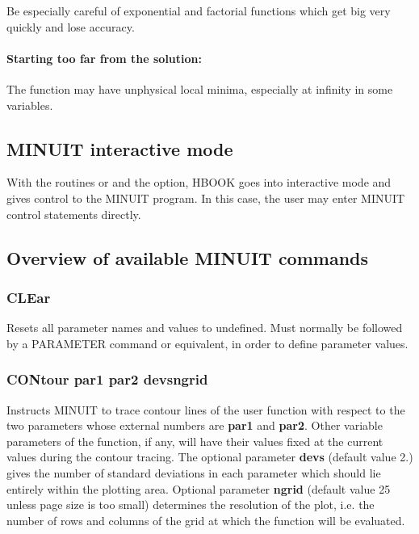 Be especially careful of exponential and factorial functions
which get big very quickly and lose accuracy.

\paragraph{Starting too far from the solution:}

The function may have unphysical local minima, especially
at infinity in some variables.

\subsection{MINUIT interactive mode}
\label{H2MWMIN}

With the routines  or  and the
 option, HBOOK goes into interactive mode and gives control to
the MINUIT program.
In this case, the user may enter MINUIT control statements directly.

\subsection*{Overview of available MINUIT commands}

\subsubsection*{CLEar}

Resets all parameter names and values to undefined. Must normally be
followed by a PARAMETER command or equivalent, in order to define
parameter values.
\subsubsection*{CONtour  par1  par2  \lsb devs\rsb   \lsb ngrid\rsb }
\par
Instructs MINUIT to trace contour lines of the user function with
respect to the two parameters whose external numbers are {\bf par1}
and {\bf par2}.
Other variable parameters of the function, if any, will have their
values fixed at the current values during the contour tracing.
The optional parameter {\bf \lsb devs\rsb } (default value 2.)
gives the number of
standard deviations in each parameter which should lie entirely within
the plotting area. Optional parameter {\bf \lsb ngrid\rsb }
(default value 25 unless
page size is too small) determines the resolution of the plot, i.e.
the number of rows and columns of the grid at which the function
will be evaluated.
